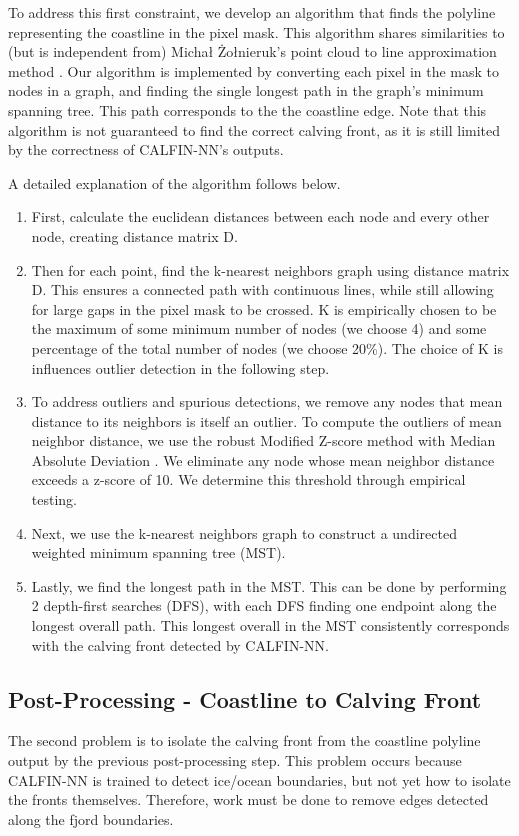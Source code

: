 \documentclass[tc, manuscript]{copernicus}
\begin{document}
To address this first constraint, we develop an algorithm that finds the polyline representing the coastline in the pixel mask. This algorithm shares similarities to (but is independent from) Michał Żołnieruk's point cloud to line approximation method \citep{żołnieruk2016}. Our algorithm is implemented by converting each pixel in the mask to nodes in a graph, and finding the single longest path in the graph's minimum spanning tree. This path corresponds to the the coastline edge. Note that this algorithm is not guaranteed to find the correct calving front, as it is still limited by the correctness of CALFIN-NN's outputs.

A detailed explanation of the algorithm follows below.


\begin{enumerate}
    \item First, calculate the euclidean distances between each node and every other node, creating distance matrix D.
    \item Then for each point, find the k-nearest neighbors graph using distance matrix D. This ensures a connected path with continuous lines, while still allowing for large gaps in the pixel mask to be crossed. K is empirically chosen to be the maximum of some minimum number of nodes (we choose 4) and some percentage of the total number of nodes (we choose 20\%). The choice of K is influences outlier detection in the following step. 
    \item To address outliers and spurious detections, we remove any nodes that mean distance to its neighbors is itself an outlier. To compute the outliers of mean neighbor distance, we use the robust Modified Z-score method with Median Absolute Deviation \citep{garcia2012}. We eliminate any node whose mean neighbor distance exceeds a z-score of 10. We determine this threshold through empirical testing. 
    \item Next, we use the k-nearest neighbors graph to construct a undirected weighted minimum spanning tree (MST).
    \item Lastly, we find the longest path in the MST. This can be done by performing 2 depth-first searches (DFS), with each DFS finding one endpoint along the longest overall path. This longest overall in the MST consistently corresponds with the calving front detected by CALFIN-NN.
\end{enumerate}

\subsection{Post-Processing - Coastline to Calving Front}
The second problem is to isolate the calving front from the coastline polyline output by the previous post-processing step. This problem occurs because CALFIN-NN is trained to detect ice/ocean boundaries, but not yet how to isolate the fronts themselves. Therefore, work must be done to remove edges detected along the fjord boundaries.
\end{document}
